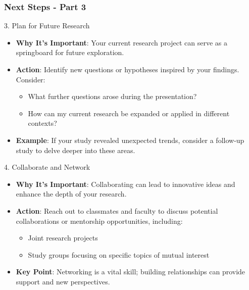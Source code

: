 \documentclass[aspectratio=169]{beamer}
\begin{document}
\begin{frame}[fragile]
    \frametitle{Next Steps - Part 3}
    
    \begin{block}{3. Plan for Future Research}
        \begin{itemize}
            \item \textbf{Why It's Important}: Your current research project can serve as a springboard for future exploration.
            \item \textbf{Action}: Identify new questions or hypotheses inspired by your findings. Consider:
                \begin{itemize}
                    \item What further questions arose during the presentation?
                    \item How can my current research be expanded or applied in different contexts?
                \end{itemize}
            \item \textbf{Example}: If your study revealed unexpected trends, consider a follow-up study to delve deeper into these areas.
        \end{itemize}
    \end{block}
    
    \begin{block}{4. Collaborate and Network}
        \begin{itemize}
            \item \textbf{Why It's Important}: Collaborating can lead to innovative ideas and enhance the depth of your research.
            \item \textbf{Action}: Reach out to classmates and faculty to discuss potential collaborations or mentorship opportunities, including:
                \begin{itemize}
                    \item Joint research projects
                    \item Study groups focusing on specific topics of mutual interest
                \end{itemize}
            \item \textbf{Key Point}: Networking is a vital skill; building relationships can provide support and new perspectives.
        \end{itemize}
    \end{block}
\end{frame}
\end{document}
